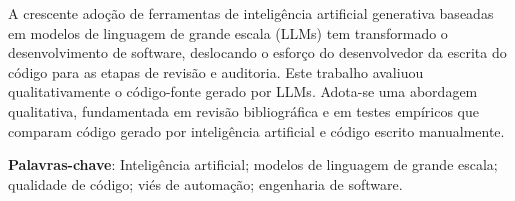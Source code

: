 	A crescente adoção de ferramentas de inteligência artificial generativa 
baseadas em modelos de linguagem de grande escala (LLMs) tem transformado o 
desenvolvimento de software, deslocando o esforço do desenvolvedor da escrita do 
código para as etapas de revisão e auditoria. Este trabalho avaliuou 
qualitativamente o código-fonte gerado por LLMs. Adota-se uma abordagem 
qualitativa, fundamentada em revisão bibliográfica e em testes empíricos que 
comparam código gerado por inteligência artificial e código escrito manualmente. 

\textbf{Palavras-chave}: Inteligência artificial; modelos de linguagem de grande 
escala; qualidade de código; viés de automação; engenharia de software. 